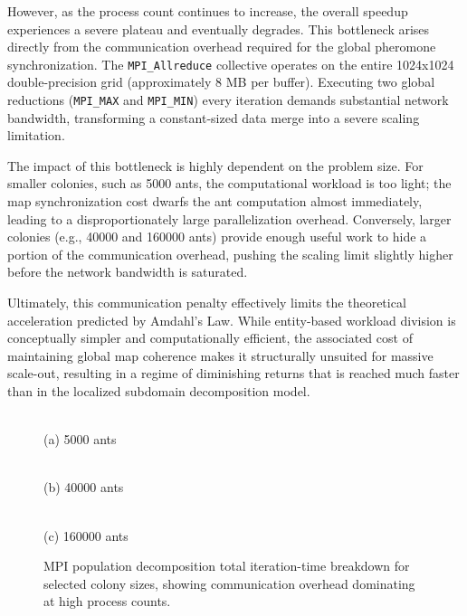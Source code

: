 However, as the process count continues to increase, the overall speedup experiences a severe plateau and eventually degrades. This bottleneck arises directly from the communication overhead required for the global pheromone synchronization. The \texttt{MPI\_Allreduce} collective operates on the entire 1024x1024 double-precision grid (approximately 8 MB per buffer). Executing two global reductions (\texttt{MPI\_MAX} and \texttt{MPI\_MIN}) every iteration demands substantial network bandwidth, transforming a constant-sized data merge into a severe scaling limitation.

The impact of this bottleneck is highly dependent on the problem size. For smaller colonies, such as 5000 ants, the computational workload is too light; the map synchronization cost dwarfs the ant computation almost immediately, leading to a disproportionately large parallelization overhead. Conversely, larger colonies (e.g., 40000 and 160000 ants) provide enough useful work to hide a portion of the communication overhead, pushing the scaling limit slightly higher before the network bandwidth is saturated.

Ultimately, this communication penalty effectively limits the theoretical acceleration predicted by Amdahl's Law. While entity-based workload division is conceptually simpler and computationally efficient, the associated cost of maintaining global map coherence makes it structurally unsuited for massive scale-out, resulting in a regime of diminishing returns that is reached much faster than in the localized subdomain decomposition model.

\begin{figure}[!htbp]
\centering
\begin{minipage}{0.48\columnwidth}
    \centering
    \\[-2mm]
    {\footnotesize (a) 5000 ants}
\end{minipage}
\hfill
\begin{minipage}{0.48\columnwidth}
    \centering
    \\[-2mm]
    {\footnotesize (b) 40000 ants}
\end{minipage}

\vspace{1mm}
\begin{minipage}{0.62\columnwidth}
    \centering
    \\[-2mm]
    {\footnotesize (c) 160000 ants}
\end{minipage}
\caption{MPI population decomposition total iteration-time breakdown for selected colony sizes, showing communication overhead dominating at high process counts.}
\label{fig:pop_total_breakdown_selected}
\end{figure}

